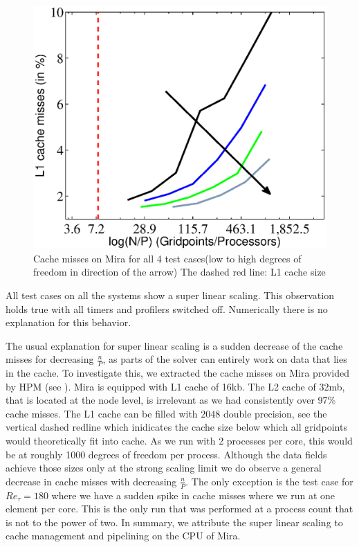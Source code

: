 \documentclass{sig-alternate}
\begin{document}
\begin{figure}
  \centering
  \includegraphics[width=\linewidth]{./figures/cachearrow.eps}
  \caption{Cache misses on Mira for all 4 test cases(low to high degrees of freedom in direction of the arrow) The dashed red line: L1 cache size}
   \label{fig:cachemisses}
\end{figure}

All test cases on all the systems show a super linear scaling. This
observation holds true with all timers and profilers switched off.
Numerically there is no explanation for this behavior. 

The usual explanation for super linear scaling is a sudden decrease of the cache
misses for decreasing $\frac{n}{P}$, as parts of the solver can entirely work on
data that lies in the cache. 
To investigate this, we extracted the cache misses on Mira provided by HPM (see
). Mira is equipped with L1 cache of 16kb. The L2 cache
of 32mb, that is located at the node level, is irrelevant as we had consistently
over 97\% cache misses. The L1 cache can be filled with $2048$ double precision, see
 the vertical dashed redline which inidicates the cache size below which all gridpoints would theoretically fit into cache. As we run with 2 processes per core, this would be at roughly 1000
degrees of freedom per process. Although the data fields achieve those sizes only at the strong scaling
limit we do observe a general decrease in cache misses with decreasing
$\frac{n}{P}$. The only exception is the test case for $Re_{\tau}=180$ where we
have a sudden spike in cache misses where we run at one element per core. This
is the only run that was performed at a process count that is not to the power
of two.
In summary, we attribute the super linear scaling to cache
management and pipelining on the CPU of Mira. 
\end{document}

